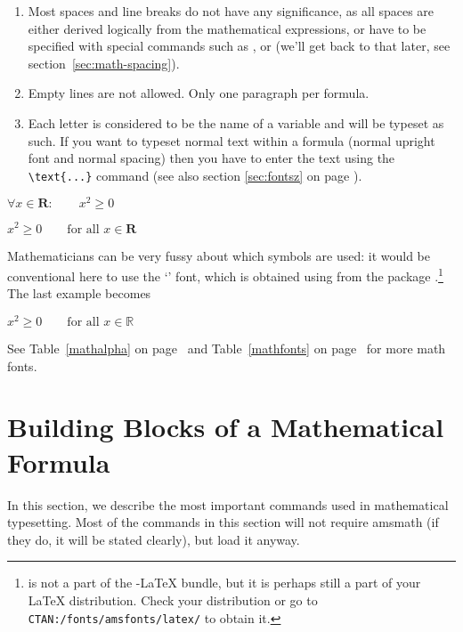 \begin{enumerate}

\item {} Most spaces and line breaks do not have any significance, as all spaces
are either derived logically from the mathematical expressions, or
have to be specified with special commands such as \ci{,},  or
 (we'll get back to that later, see section~\ref{sec:math-spacing}).
 
\item Empty lines are not allowed. Only one paragraph per formula.

\item Each letter is considered to be the name of a variable and will be
typeset as such. If you want to typeset normal text within a formula
(normal upright font and normal spacing) then you have to enter the
text using the \verb|\text{...}| command (see also section \ref{sec:fontsz} on
page \pageref{sec:fontsz}).

\end{enumerate}
\begin{example}
$\forall x \in \mathbf{R}:
 \qquad x^{2} \geq 0$
\end{example}
\begin{example}
$x^{2} \geq 0\qquad
 \text{for all }x\in\mathbf{R}$
\end{example}
 
Mathematicians can be very fussy about which symbols are used:
it would be conventional here to use the `' font,
 which is obtained using  from the
package .\footnote{ is not a part
  of the \AmS-\LaTeX{} bundle, but it is perhaps still a part of your \LaTeX{}
  distribution. Check your distribution
  or go to \texttt{CTAN:/fonts/amsfonts/latex/} to obtain it.}
\ifx\mathbb\undefined\else
The last example becomes
\begin{example}
$x^{2} \geq 0\qquad
 \text{for all } x 
 \in \mathbb{R}$
\end{example}
\fi
See Table~\ref{mathalpha} on page~\pageref{mathalpha} and
Table~\ref{mathfonts} on page~\pageref{mathfonts} for more math fonts.



\section{Building Blocks of a Mathematical Formula}

In this section, we describe the most important commands used in mathematical
typesetting. Most of the commands in this section will not require
\textsf{amsmath} (if they do, it will be stated clearly), but load it anyway.


